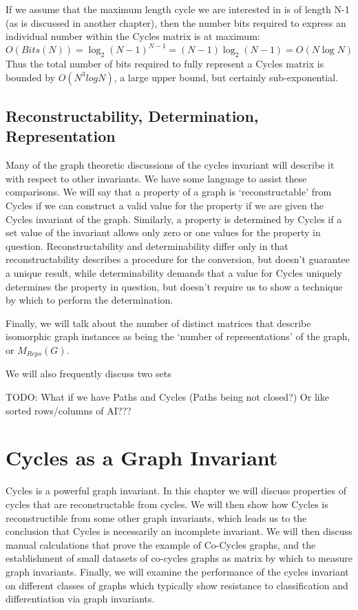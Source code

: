 \documentclass[11pt,a4paper]{report}
\begin{document}
If we assume that the maximum length cycle we are interested in is of length N-1 (as is discussed in another chapter), then the number bits required to express an individual number within the Cycles matrix is at maximum:
$$ O(Bits(N)) = \log_2 (N-1)^{N-1} = (N - 1) \log_2 (N-1) = O(N \log N)$$
Thus the total number of bits required to fully represent a Cycles matrix is bounded by $O(N^3logN)$, a large upper bound, but certainly sub-exponential.

\section{Reconstructability, Determination, Representation}
Many of the graph theoretic discussions of the cycles invariant will describe it with respect to other invariants. We have some language to assist these comparisons.
We will say that a property of a graph is `reconstructable' from Cycles if we can construct a valid value for the property if we are given the Cycles invariant of the graph.
Similarly, a property is determined by Cycles if a set value of the invariant allows only zero or one values for the property in question.
Reconstructability and determinability differ only in that reconstructability describes a procedure for the conversion, but doesn't guarantee a unique result, while determinability demands that a value for Cycles uniquely determines the property in question, but doesn't require us to show a technique by which to perform the determination.

Finally, we will talk about the number of distinct matrices that describe isomorphic graph instances as being the `number of representations' of the graph, or $M_{Reps}(G)$.

We will also frequently discuss two sets

TODO: What if we have Paths and Cycles (Paths being not closed?) Or like sorted rows/columns of AI???


\chapter{Cycles as a Graph Invariant}
Cycles is a powerful graph invariant.
In this chapter we will discuss properties of cycles that are reconstructable from cycles.
We will then show how Cycles is reconstructible from some other graph invariants, which leads us to the conclusion that Cycles is necessarily an incomplete invariant.
We will then discuss manual calculations that prove the example of Co-Cycles graphs, and the establishment of small datasets of co-cycles graphs as matrix by which to measure graph invariants.
Finally, we will examine the performance of the cycles invariant on different classes of graphs which typically show resistance to classification and differentiation via graph invariants.
\end{document}
